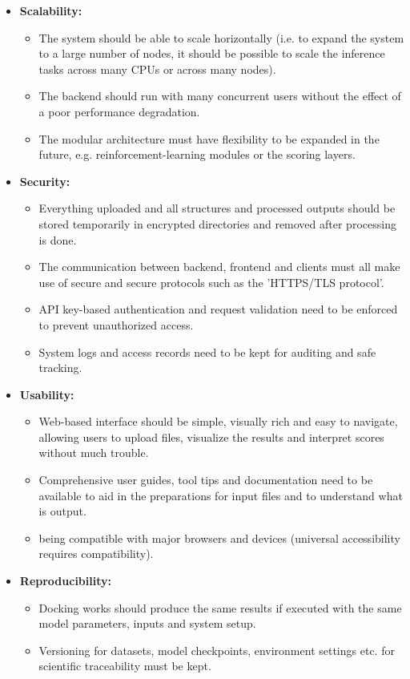 \documentclass[12pt,a4]{report}
\begin{document}
\begin{itemize}
\item \textbf{Scalability:}
\begin{itemize}
\item The system should be able to scale horizontally (i.e. to expand the system to a large number of nodes, it should be possible to scale the inference tasks across many CPUs or across many nodes).
\item The backend should run with many concurrent users without the effect of a poor performance degradation.
\item The modular architecture must have flexibility to be expanded in the future, e.g. reinforcement-learning modules or the scoring layers.
\end{itemize}

\item \textbf{Security:}
\begin{itemize}
\item Everything uploaded and all structures and processed outputs should be stored temporarily in encrypted directories and removed after processing is done.
\item The communication between backend, frontend and clients must all make use of secure and secure protocols such as the 'HTTPS/TLS protocol'.
\item API key-based authentication and request validation need to be enforced to prevent unauthorized access.
\item System logs and access records need to be kept for auditing and safe tracking.
\end{itemize}

\item \textbf{Usability:}
\begin{itemize}
\item Web-based interface should be simple, visually rich and easy to navigate, allowing users to upload files, visualize the results and interpret scores without much trouble.
\item Comprehensive user guides, tool tips and documentation need to be available to aid in the preparations for input files and to understand what is output.
\item being compatible with major browsers and devices (universal accessibility requires compatibility).
\end{itemize}

\item \textbf{Reproducibility:}
\begin{itemize}
\item Docking works should produce the same results if executed with the same model parameters, inputs and system setup.
\item Versioning for datasets, model checkpoints, environment settings etc. for scientific traceability must be kept.
\end{itemize}

\end{itemize}
\end{document}
